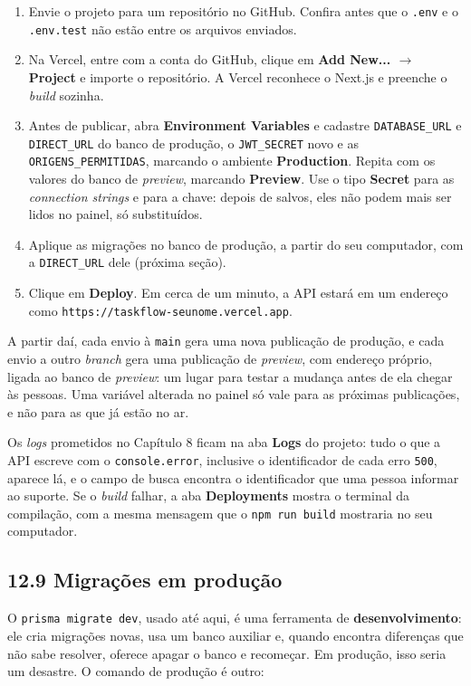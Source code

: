 \begin{enumerate}
  \item Envie o projeto para um repositório no GitHub. Confira antes que o \texttt{.env} e o \texttt{.env.test} não estão entre os arquivos enviados.
  \item Na Vercel, entre com a conta do GitHub, clique em \textbf{Add New... $\rightarrow$ Project} e importe o repositório. A Vercel reconhece o Next.js e preenche o \textit{build} sozinha.
  \item Antes de publicar, abra \textbf{Environment Variables} e cadastre \texttt{DATABASE\_URL} e \texttt{DIRECT\_URL} do banco de produção, o \texttt{JWT\_SECRET} novo e as \texttt{ORIGENS\_PERMITIDAS}, marcando o ambiente \textbf{Production}. Repita com os valores do banco de \textit{preview}, marcando \textbf{Preview}. Use o tipo \textbf{Secret} para as \textit{connection strings} e para a chave: depois de salvos, eles não podem mais ser lidos no painel, só substituídos.
  \item Aplique as migrações no banco de produção, a partir do seu computador, com a \texttt{DIRECT\_URL} dele (próxima seção).
  \item Clique em \textbf{Deploy}. Em cerca de um minuto, a API estará em um endereço como \texttt{https://taskflow-seunome.vercel.app}.
\end{enumerate}

A partir daí, cada envio à \texttt{main} gera uma nova publicação de produção, e cada envio a outro \textit{branch} gera uma publicação de \textit{preview}, com endereço próprio, ligada ao banco de \textit{preview}: um lugar para testar a mudança antes de ela chegar às pessoas. Uma variável alterada no painel só vale para as próximas publicações, e não para as que já estão no ar.

Os \textit{logs} prometidos no Capítulo 8 ficam na aba \textbf{Logs} do projeto: tudo o que a API escreve com o \texttt{console.error}, inclusive o identificador de cada erro \texttt{500}, aparece lá, e o campo de busca encontra o identificador que uma pessoa informar ao suporte. Se o \textit{build} falhar, a aba \textbf{Deployments} mostra o terminal da compilação, com a mesma mensagem que o \texttt{npm run build} mostraria no seu computador.

\subsection{12.9 Migrações em produção}

O \texttt{prisma migrate dev}, usado até aqui, é uma ferramenta de \textbf{desenvolvimento}: ele cria migrações novas, usa um banco auxiliar e, quando encontra diferenças que não sabe resolver, oferece apagar o banco e recomeçar. Em produção, isso seria um desastre. O comando de produção é outro:

